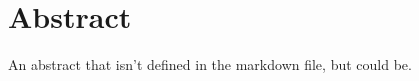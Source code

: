 \chapter*{Abstract}

An abstract that isn't defined in the markdown file, but could be.

\cleardoublepage
